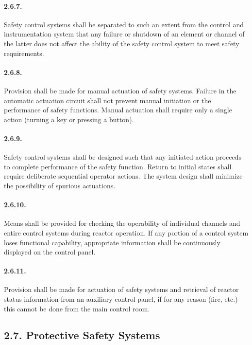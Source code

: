 \documentclass[openright]{bookest}
\begin{document}
\paragraph{2.6.7.}
Safety control systems shall be separated to such an extent from the control and instrumentation system that any failure or shutdown of an element or channel of the latter does not affect the ability of the safety control system to meet safety requirements.

\paragraph{2.6.8.}
Provision shall be made for manual actuation of safety systems.  
Failure in the automatic actuation circuit shall not prevent manual initiation or the performance of safety functions.  
Manual actuation shall require only a single action (turning a key or pressing a button).

\paragraph{2.6.9.}
Safety control systems shall be designed such that any initiated action proceeds to complete performance of the safety function.  
Return to initial states shall require deliberate sequential operator actions.  
The system design shall minimize the possibility of spurious actuations.

\paragraph{2.6.10.}
Means shall be provided for checking the operability of individual channels and entire control systems during reactor operation.  
If any portion of a control system loses functional capability, appropriate information shall be continuously displayed on the control panel.

\paragraph{2.6.11.}
Provision shall be made for actuation of safety systems and retrieval of reactor status information from an auxiliary control panel, if for any reason (fire, etc.) this cannot be done from the main control room.

\subsection*{2.7. Protective Safety Systems}
\end{document}
